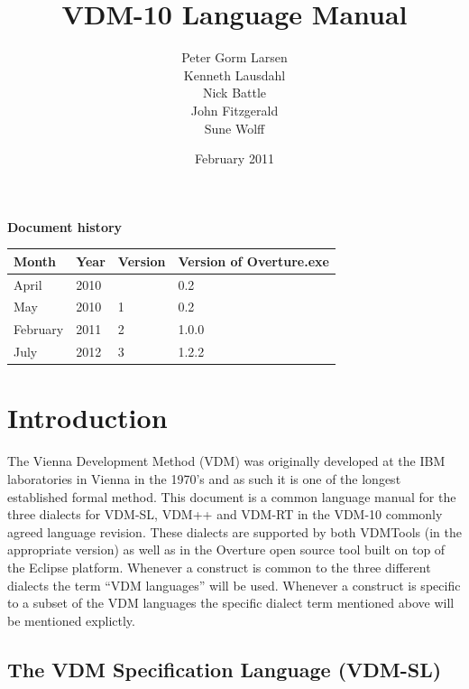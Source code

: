 \documentclass{overturerepchap}
\begin{document}
 
\title{VDM-10 Language Manual}
\author{Peter Gorm Larsen\\
        Kenneth Lausdahl\\
        Nick Battle\\
        John Fitzgerald\\
        Sune Wolff}

\date{February 2011}

\maketitle


{\textbf{Document history}}

\begin{tabular}{|l|l|l|l|}\hline
Month   & Year & Version & Version of Overture.exe \\ \hline
April   & 2010 &         & 0.2   \\ \hline
May     & 2010 & 1       & 0.2   \\ \hline
February& 2011 & 2       & 1.0.0 \\ \hline
July    & 2012 & 3       & 1.2.2 \\ \hline
\end{tabular}

\tableofcontents
\newpage
\mbox{}
\newpage
{} 
\setcounter{page}{1}

\chapter{Introduction}

The Vienna Development Method (VDM)
\cite{Bjorner&78,Jones90a,Fitzgerald&08c} was originally developed at
the IBM laboratories in Vienna in the 1970's and as such it is one of
the longest established formal method.
This document is a common language manual for the three dialects for
VDM-SL, VDM++ and VDM-RT in the VDM-10 commonly agreed language
revision. These dialects are supported by both VDMTools
\cite{Fitzgerald&08a} (in the appropriate version) as well as in the
Overture open source tool \cite{Larsen&10a} built on top of the
Eclipse platform. Whenever a construct is common to the three
different dialects the term ``VDM languages'' will be used. Whenever a
construct is specific to a subset of the VDM languages the specific
dialect term mentioned above will be mentioned explictly.

\section{The VDM Specification Language (VDM-SL)}
\end{document}
